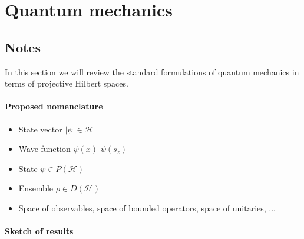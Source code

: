 \chapter{Quantum mechanics}


\section{Notes}

In this section we will review the standard formulations of quantum mechanics in terms of projective Hilbert spaces.

\subsubsection{Proposed nomenclature}

\begin{itemize}
	\item State vector $|\psi \> \in  \mathcal{H}$
	\item[?] Wave function $\psi(x)$ $\psi(s_z)$
	\item State $\psi \in  P(\mathcal{H})$
	\item Ensemble $\rho \in D(\mathcal{H})$
	\item[?] Space of observables, space of bounded operators, space of unitaries, ...
\end{itemize}

\subsubsection{Sketch of results}

